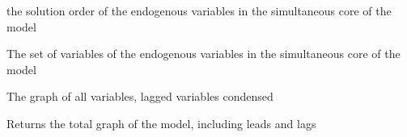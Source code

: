 \documentclass[letterpaper,10pt,english]{sphinxmanual}
\begin{document}
\begin{fulllineitems}
\begin{fulllineitems}
\end{fulllineitems}


\begin{fulllineitems}
\label{\detokenize{index:modelclass.Graph_Mixin.coreorder}}
\pysigstartsignatures
{}
\pysigstopsignatures
\sphinxAtStartPar
the solution order of the endogenous variables in the simultaneous core of the model

\end{fulllineitems}


\begin{fulllineitems}
\label{\detokenize{index:modelclass.Graph_Mixin.coreset}}
\pysigstartsignatures
{}
\pysigstopsignatures
\sphinxAtStartPar
The set of variables of the endogenous variables in the simultaneous core of the model

\end{fulllineitems}


\begin{fulllineitems}
\label{\detokenize{index:modelclass.Graph_Mixin.totgraph_nolag}}
\pysigstartsignatures
{}
\pysigstopsignatures
\sphinxAtStartPar
The graph of all variables, lagged variables condensed

\end{fulllineitems}


\begin{fulllineitems}
\label{\detokenize{index:modelclass.Graph_Mixin.totgraph}}
\pysigstartsignatures
{}
\pysigstopsignatures
\sphinxAtStartPar
Returns the total graph of the model, including leads and lags


\end{fulllineitems}
\end{fulllineitems}
\end{document}
